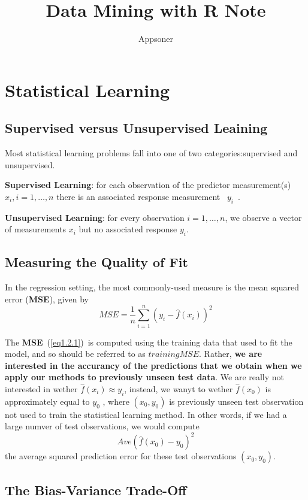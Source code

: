 \documentclass{article}
\title{Data Mining with R Note}
\author{Appsoner}
\begin{document}
\maketitle
\tableofcontents
\section{Statistical Learning}
\subsection{Supervised versus Unsupervised Leaining}

Most statistical learning problems fall into one of two categories:supervised and unsupervised.

\textbf{Supervised Learning}: for each observation of the predictor measurement(s) $x_i,i = 1,\dots,n$ there is an associated response measurement ~$y_i$~.

\textbf{Unsupervised Learning}: for every observation $i=1,\dots,n$, we observe a vector of measurements $x_i$ but no associated response $y_i$.
\subsection{Measuring the Quality of Fit}
In the regression setting, the most commonly-used measure is the mean squared error (\textbf{MSE}), given by
\begin{equation}\label{eq1.2.1}
MSE = \frac{1}{n}\sum_{i=1}^{n}(y_i-\hat{f}(x_i))^2 
\end{equation}

The \textbf{MSE}~(\ref{eq1.2.1})~is computed using the training data that used to fit the model, and so should be referred to as $\mathit{training MSE}$. Rather, \textbf{we are interested in the accurancy of the predictions that we obtain when we apply our methods to previously unseen test data}. We are really not interested in wether $\hat{f}(x_i)\approx y_i$, instead, we wanyt to wether $\hat{f}(x_0)$ is approximately equal to $y_0$ , where $(x_0, y_0)$ is previously unseen test observation not used to train the statistical learning method. In other words, if we had a large numver of test observations, we would compute 
\begin{equation}
Ave(\hat{f}(x_0)-y_0)^2
\end{equation}
the average squared prediction error for these test observations $(x_0,y_0)$.
\subsection{The Bias-Variance Trade-Off}
\end{document}
